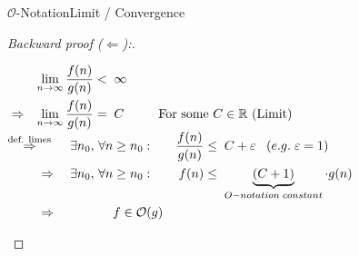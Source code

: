 \begin{frame}{$\mathcal{O}$-Notation}{Limit / Convergence}
  \begin{proof}[Backward proof ($\Leftarrow$):]
    \begin{center}
      \vspace{-0.5em}
      \begin{math}
        \begin{aligned}
          & {} & \lim_{n \to \infty} \frac{f(n)}{g(n)} &< \; \infty\\
          & \Rightarrow & \lim_{n \to \infty} \frac{f(n)}{g(n)} &= \; C &&
          \hspace*{1.5em}\text{For some } C \in \mathbb{R} \text{ (Limit)}
        \end{aligned}
      \end{math}
      \vspace{1.0em}\\
      \begin{math}
        \begin{aligned}
          \stackrel{\text{def. limes}}{\Rightarrow} \hspace*{0.5em} &&
          \exists n_0, \, \forall n \geq n_0: \hspace*{1.0em}&&
          \frac{f(n)}{g(n)} &\leq \; C + \varepsilon \;\;\; (e.g.\;\varepsilon = 1)\\
          \Rightarrow \; &&
          \exists n_0, \, \forall n \geq n_0: \hspace*{1.0em}&&
          f(n) &\leq \; \underbrace{(C + 1)}_{O-notation\;constant} \cdot g(n)\\
          \Rightarrow \; &&
          f \in \mathcal{O}(g)
          \qedhere
        \end{aligned}
      \end{math}
    \end{center}
  \end{proof}
\end{frame}
